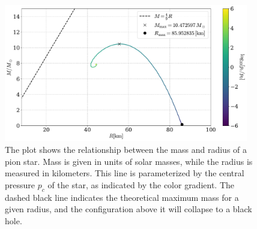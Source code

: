 \begin{figure}[h]
    \centering
    \includegraphics[width=0.95\textwidth]{../scripts/figurer/mass_radius_pion_star_tree.pdf}
    \caption{
        The plot shows the relationship between the mass and radius of a pion star. Mass is given in units of solar masses, while the radius is measured in kilometers.
        This line is parameterized by the central pressure $p_c$ of the star, as indicated by the color gradient.
        The dashed black line indicates the theoretical maximum mass for a given radius, and the configuration above it will collapse to a black hole.
        }
        \label{fig: mass radius relation tree-level pion star}
\end{figure}

